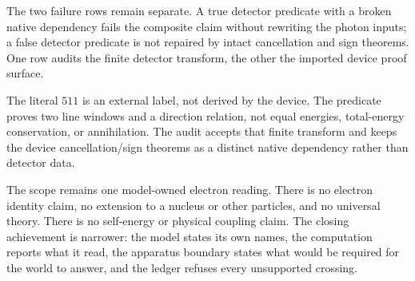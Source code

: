 The two failure rows remain separate.  A true detector predicate with a broken native dependency fails the composite
claim without rewriting the photon inputs; a false detector predicate is not repaired by intact cancellation and
sign theorems.  One row audits the finite detector transform, the other the imported device proof surface.

The literal \(511\) is an external label, not derived by the device.  The predicate proves two line windows and a
direction relation, not equal energies, total-energy conservation, or annihilation.  The audit accepts that finite
transform and keeps the device cancellation/sign theorems as a distinct native dependency rather than detector data.

The scope remains one model-owned electron reading.  There is no electron identity claim, no extension to a nucleus
or other particles, and no universal theory.  There is no self-energy or physical coupling claim.  The closing
achievement is narrower: the model states its own names, the computation reports what it read, the apparatus boundary
states what would be required for the world to answer, and the ledger refuses every unsupported crossing.
